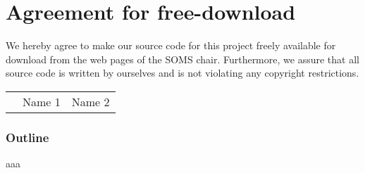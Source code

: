 \documentclass[11pt]{article}
\begin{document}

\newpage


\newpage
\section*{Agreement for free-download}
\bigskip


\bigskip


\large We hereby agree to make our source code for this project freely available for download from the web pages of the SOMS chair. Furthermore, we assure that all source code is written by ourselves and is not violating any copyright restrictions.

\begin{center}

\bigskip


\bigskip


\begin{tabular}{@{}p{3.3cm}@{}p{6cm}@{}@{}p{6cm}@{}}
\begin{minipage}{3cm}

\end{minipage}
&
\begin{minipage}{6cm}
\vspace{2mm} \large Name 1

 \vspace{\baselineskip}

\end{minipage}
&
\begin{minipage}{6cm}

\large Name 2

\end{minipage}
\end{tabular}


\end{center}
\newpage
\abstract
\subsubsection{Outline}
aaa
\newpage





\end{document}
